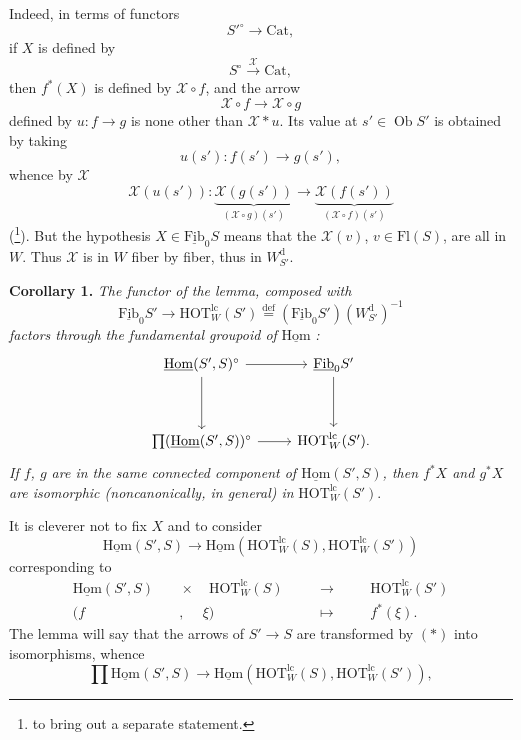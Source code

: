 \documentclass[11pt,leqno]{article}
\newcommand{\printedpage}[1]{\marginpar{\footnotesize p.~#1}}
\newcommand{\msp}[1]{\marginpar{\footnotesize [#1]}}
\newcommand{\fl}{\longrightarrow}
\newcommand{\uHom}{\underline{\mathrm{Hom}}}
\newcommand{\uFib}{\underline{\mathrm{Fib}}}
\newcommand{\Ob}{\operatorname{Ob}}
\newcommand{\HOT}{\mathrm{HOT}}
\newcommand{\Cat}{\mathrm{Cat}}
\begin{document}
\printedpage{33}
Indeed, in terms of functors
\[ S'^{\circ}\fl\Cat, \]
if $X$ is defined by
\[ S^{\circ}\xrightarrow{\ \mathscr{X}\ }\Cat, \]
then $f^*(X)$ is defined by $\mathscr{X}\circ f$, and the arrow
\[ \mathscr{X}\circ f\fl\mathscr{X}\circ g \]
defined by $u : f\fl g$ is none other than $\mathscr{X}*u$. Its value at $s'\in\Ob S'$ is obtained by taking
\[ u(s') : f(s')\fl g(s'), \]
whence by $\mathscr{X}$
\[ \mathscr{X}(u(s')) : \underbrace{\mathscr{X}(g(s'))}_{(\mathscr{X}\circ g)(s')}\fl\underbrace{\mathscr{X}(f(s'))}_{(\mathscr{X}\circ f)(s')} \]
(\footnote[53]{to bring out a separate statement.}). But the hypothesis $X\in\uFib_0S$ means that the $\mathscr{X}(v)$, $v\in\mathrm{Fl}(S)$, are all in $W$. Thus
\msp{page 45}$\mathscr{X}$ is in $W$ fiber by fiber, thus in $W^{\mathrm{d}}_{S'}$.

\textbf{Corollary 1.} \textit{The functor of the lemma, composed with}
\[ \uFib_0S'\fl\HOT^{\mathrm{lc}}_W(S')\overset{\text{def}}{=}(\uFib_0S')(W^{\mathrm{d}}_{S'})^{-1} \]
\textit{factors through the fundamental groupoid of} $\uHom$ \textit{:}
\[
\begin{tikzcd}[row sep=huge]
\uHom(S',S)^{\circ} \arrow[r] \arrow[d] & \uFib_0S' \arrow[d] \\
\textstyle\prod(\uHom(S',S))^{\circ} \arrow[r] & \HOT^{\mathrm{lc}}_W(S').
\end{tikzcd}
\]
\textit{If $f$, $g$ are in the same connected component of $\uHom(S',S)$, then $f^*X$ and $g^*X$ are isomorphic (noncanonically, in general) in} $\HOT^{\mathrm{lc}}_W(S')$.

It is cleverer not to fix $X$ and to consider
\[ \uHom(S',S)\fl\uHom(\HOT^{\mathrm{lc}}_W(S),\HOT^{\mathrm{lc}}_W(S')) \tag*{$(*)$} \]
corresponding to
\[
\begin{aligned}
\uHom(S',S) &\quad\times\quad \HOT^{\mathrm{lc}}_W(S) &&\quad\longrightarrow\quad &&\HOT^{\mathrm{lc}}_W(S')\\
(f &\quad,\quad\ \xi) &&\quad\longmapsto\quad && f^*(\xi).
\end{aligned}
\]
The lemma will say that the arrows of $S'\fl S$ are transformed by $(*)$ into isomorphisms, whence
\[ \prod\uHom(S',S)\fl\uHom(\HOT^{\mathrm{lc}}_W(S),\HOT^{\mathrm{lc}}_W(S')), \]
\end{document}
